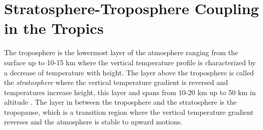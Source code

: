 

 
 
 





\section{Stratosphere-Troposphere Coupling in the Tropics}\label{sq:qbolit}

The troposphere is the lowermost layer of the atmosphere ranging from the surface up to 10-15 km where the vertical temperature profile is characterized by a decrease of temperature with height.
The layer above the troposphere is called the \textit{stratosphere} where the vertical temperature gradient is reversed and temperatures increase height, this layer  and spans from   10-20 km up to 50 km in altitude \citep{andrews1987}. 
The layer in between the troposphere and the stratosphere is the tropopause, which is a transition region where the vertical temperature gradient reverses and the atmosphere is stable to upward motions. 


